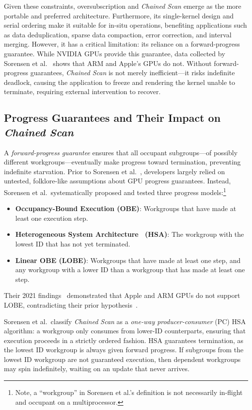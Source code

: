 \documentclass[acmsmall, manuscript, screen, review, anonymous]{acmart}
\begin{document}
Given these constraints, oversubscription and \emph{Chained Scan} emerge as the more portable and preferred architecture. Furthermore, its single-kernel design and serial ordering make it suitable for in-situ operations, benefiting applications such as data deduplication, sparse data compaction, error correction, and interval merging. However, it has a critical limitation: its reliance on a forward-progress guarantee. While NVIDIA GPUs provide this guarantee, data collected by Sorensen et al.~\cite{sorensen2021} shows that ARM and Apple’s GPUs do not. Without forward-progress guarantees, \emph{Chained Scan} is not merely inefficient---it risks indefinite deadlock, causing the application to freeze and rendering the kernel unable to terminate, requiring external intervention to recover.

\subsection{Progress Guarantees and Their Impact on \emph{Chained Scan}}
A \emph{forward-progress guarantee} ensures that all occupant subgroups---of possibly different workgroups---eventually make progress toward termination, preventing indefinite starvation. Prior to Sorensen et al.~\cite{sorensen2018,sorensen2021}, developers largely relied on untested, folklore-like assumptions about GPU progress guarantees. Instead, Sorensen et al.\ systematically proposed and tested three progress models:\footnote{Note, a ``workgroup'' in Sorensen et al.'s definition is not necessarily in-flight and occupant on a multiprocessor.}
\begin{itemize}
  \item \textbf{Occupancy-Bound Execution (OBE)}: Workgroups that have made at least one execution step.
  \item \textbf{Heterogeneous System Architecture~\cite[Section~2.11]{HSASysArch12} (HSA)}: The workgroup with the lowest ID that has not yet terminated.
  \item \textbf{Linear OBE (LOBE)}: Workgroups that have made at least one step, and any workgroup with a lower ID than a workgroup that has made at least one step.
\end{itemize}
Their 2021 findings~\cite{sorensen2021} demonstrated that Apple and ARM GPUs do not support LOBE, contradicting their prior hypothesis~\cite{sorensen2018}.

Sorensen et al.\ classify \emph{Chained Scan} as a \emph{one-way producer-consumer} (PC) HSA algorithm: a workgroup only consumes from lower-ID counterparts, ensuring that execution proceeds in a strictly ordered fashion. HSA guarantees termination, as the lowest ID workgroup is always given forward progress. If subgroups from the lowest ID workgroup are not guaranteed execution, then dependent workgroups may spin indefinitely, waiting on an update that never arrives.
\end{document}
